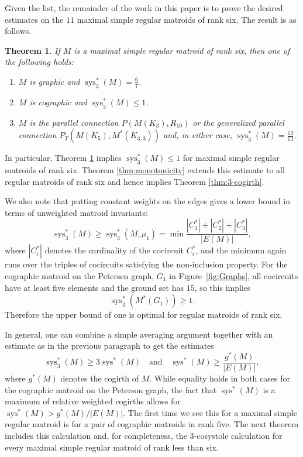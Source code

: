 \documentclass[reqno,12pt]{amsart}
\newtheorem{main}{Theorem}\renewcommand{\themain}{\Alph{main}}
\numberwithin{theorem}{section}
\theoremstyle{plain}
\theoremstyle{definition}
\theoremstyle{remark}
\numberwithin{equation}{section}
\numberwithin{table}{section}
\DeclareMathOperator{\sys}{sys}
\begin{document}
Given the list, the remainder of the work in this paper is to prove the desired estimates on the $11$ maximal simple regular matroids of rank six. The result is as follows. 

\begin{main}\label{thm:estimates}
If $M$ is a maximal simple regular matroid of rank six, then one of the following holds:
    \begin{enumerate}
        \item $M$ is graphic and $\sys_3^*(M) = \tfrac 6 7$.
        \item $M$ is cographic and $\sys_3^*(M) \leq 1$. 
        \item $M$ is the parallel connection $P(M(K_3), R_{10})$ or the generalized parallel connection $P_T(M(K_5), M^*(K_{3,3}))$ and, in either case, $\sys_3^*(M) = \tfrac{12}{13}$.
    \end{enumerate}
\end{main}

In particular, Theorem \ref{thm:estimates} implies $\sys_3^*(M) \leq 1$ for maximal simple regular matroids of rank six. Theorem \ref{thm:monotonicity} extends this estimate to all regular matroids of rank six and hence implies Theorem \ref{thm:3-cogirth}. 

We also note that putting constant weights on the edges gives a lower bound in terms of unweighted matroid invariants:
    \[\sys_3^*(M) \geq \sys_3^*(M, \mu_1) = \min \frac{|C_1^*| + |C_2^*| + |C_3^*|}{|E(M)|},\]
where $|C_i^*|$ denotes the cardinality of the cocircuit $C_i^*$, and the minimum again runs over the triples of cocircuits satisfying the non-inclusion property. For the cographic matroid on the Petersen graph, $G_1$ in Figure~\ref{fig:Graphs}, all cocircuits have at least five elements and the ground set has $15$, so this implies
    \[\sys_3^*(M^*(G_1)) \geq 1.\]
Therefore the upper bound of one is optimal for regular matroids of rank six. 

In general, one can combine a simple averaging argument together with an estimate as in the previous paragraph to get the estimates
    \[\sys_3^*(M) \geq 3 \sys^*(M) \quad\text{and}\quad 
    \sys^*(M) \geq \frac{g^*(M)}{|E(M)|},\]
where $g^*(M)$ denotes the cogirth of $M$. While equality holds in both cases for the cographic matroid on the Peterson graph, the fact that $\sys^*(M)$ is a maximum of relative weighted cogirths allows for $\sys^*(M) > g^*(M) / |E(M)|$. The first time we see this for a maximal simple regular matroid is for a pair of cographic matroids in rank five. The next theorem includes this calculation and, for completeness, the $3$-cosystole calculation for every maximal simple regular matroid of rank less than six. 
\end{document}
